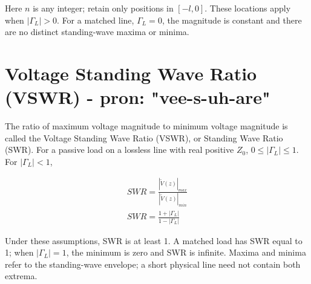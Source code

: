 \documentclass{ximera}
\begin{document}
\begin{example}
\begin{explanation}
Here $n$ is any integer; retain only positions in $[-l,0]$.
These locations apply when $|\Gamma_L|>0$. For a matched line,
$\Gamma_L=0$, the magnitude is constant and there are no distinct
standing-wave maxima or minima.




\end{explanation}
\end{example}



\section{Voltage Standing Wave Ratio (VSWR) - pron: "vee-s-uh-are"}





The ratio of maximum voltage magnitude to minimum voltage magnitude
is called the Voltage Standing Wave Ratio (VSWR), or Standing Wave
Ratio (SWR). For a passive load on a lossless line with real positive
$Z_0$, $0\le|\Gamma_L|\le1$. For $|\Gamma_L|<1$,

\begin{eqnarray}
SWR=\frac{|\tilde{V}(z)|_{max}}{|\tilde{V}(z)|_{min}} \nonumber \\
SWR=\frac{1+|\Gamma_L|}{1-|\Gamma_L|}
\end{eqnarray}



Under these assumptions, SWR is at least 1. A matched load has
SWR equal to 1; when $|\Gamma_L|=1$, the minimum is zero and
SWR is infinite. Maxima and minima refer to the standing-wave
envelope; a short physical line need not contain both extrema.
\end{document}
